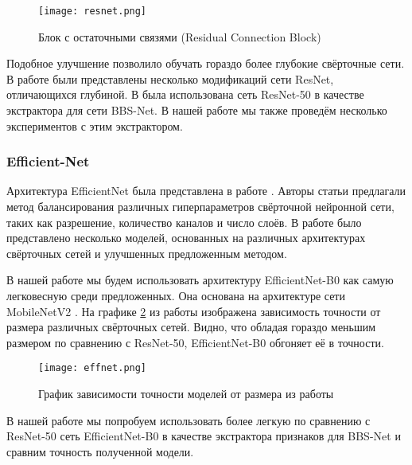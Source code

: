 \begin{figure}[h!]
    \centering
    \texttt{[image: resnet.png]}
    \caption{Блок с остаточными связями (Residual Connection Block)}
    \label{fig:resnet}
\end{figure}

Подобное улучшение позволило обучать гораздо более глубокие свёрточные сети.
В работе были представлены несколько модификаций сети ResNet, отличающихся глубиной.
В \cite{BBS} была использована сеть ResNet-50 в качестве экстрактора для сети BBS-Net. В нашей работе
мы также проведём несколько экспериментов с этим экстрактором.

\subsubsection{Efficient-Net}

Архитектура EfficientNet была представлена в работе \cite{Efficientnet}. Авторы статьи предлагали метод
балансирования различных гиперпараметров свёрточной нейронной сети, таких как разрешение, количество каналов  и число слоёв.
В работе \cite{Efficientnet} было представлено несколько моделей, основанных на различных архитектурах свёрточных сетей
и улучшенных предложенным методом.

В нашей работе мы будем использовать архитектуру EfficientNet-B0 как самую легковесную среди предложенных.
Она основана на архитектуре сети MobileNetV2 \cite{MobileNetV2}. На графике \ref{fig:effent} из работы \cite{Efficientnet}
изображена зависимость точности от размера различных свёрточных сетей. Видно, что обладая гораздо меньшим размером
по сравнению с ResNet-50, EfficientNet-B0 обгоняет её в точности.

 \begin{figure}[h!]
    \centering
    \texttt{[image: effnet.png]}
    \caption{График зависимости точности моделей от размера из работы \cite{Efficientnet}}
    \label{fig:effent}
\end{figure}

В нашей работе мы попробуем использовать более легкую по сравнению с ResNet-50 сеть EfficientNet-B0 в качестве экстрактора признаков для BBS-Net
и сравним точность полученной модели.
